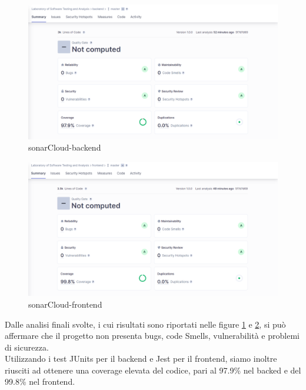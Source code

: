 \documentclass[a4paper,12pt]{report}
\begin{document}
		\begin{figure}[!h]
			\centering
			\includegraphics[width=1\linewidth]{image/sonarCloud-backend.png}
			\caption{sonarCloud-backend}\label{fig:sonarCloud-backend}
		\end{figure}	
		\begin{figure}[!h]
			\centering
			\includegraphics[width=1\linewidth]{image/sonarCloud-frontend.png}
			\caption{sonarCloud-frontend}\label{fig:sonarCloud-frontend}
		\end{figure}
		\newpage 
Dalle analisi finali svolte, i cui risultati sono riportati nelle figure \ref{fig:sonarCloud-backend} e \ref{fig:sonarCloud-frontend}, si può affermare che il progetto non presenta bugs, code Smells, vulnerabilità e problemi di sicurezza.\\
Utilizzando i test JUnits per il backend e Jest per il frontend, siamo inoltre riusciti ad ottenere una coverage elevata del codice, pari al 97.9\% nel backed e del 99.8\% nel frontend.


\newpage
\end{document}
